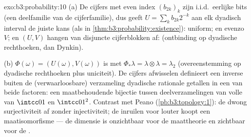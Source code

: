 \begin{solution}{exo:b3:probability:10}
(a) De cijfers met even index $(b_{2k})_k$ zijn i.i.d.\ eerlijke
bits (een deelfamilie van de  cijferfamilie), dus
geeft $U = \sum_kb_{2k}2^{-k}$ aan elk dyadisch interval de
juiste kans (als in
\cref{thm:b3:probability:existence}): uniform; en evenzo $V$; en
$(U, V)$ hangen van disjuncte cijferblokken af: 
(ontbinding op dyadische rechthoeken, dan Dynkin).

(b) $\Phi(\omega) = (U(\omega), V(\omega))$ is  met
$\Phi_*\lambda = \lambda\otimes\lambda = \lambda_2$
(overeenstemming op dyadische rechthoeken plus uniciteit). De
cijfers afwisselen definieert een inverse buiten de
(verwaarloosbare) verzameling dyadische rationale getallen in een
van beide factoren: een maatbehoudende bijectie tussen
deelverzamelingen van volle  van $\intcc01$ en
$\intcc01^2$. Contrast met Peano
(\cref{pb:b3:topology:1}): de  dwong surjectiviteit
af zonder injectiviteit; de  inruilen voor louter
 koopt een maatisomorfisme --- de dimensie is
onzichtbaar voor de maattheorie en zichtbaar voor de .
\end{solution}

